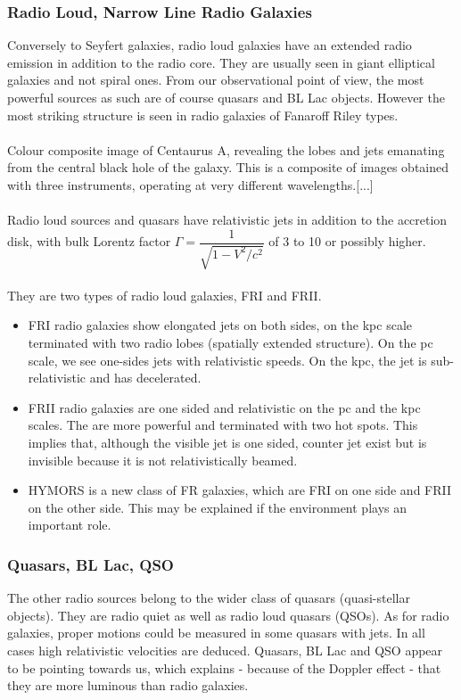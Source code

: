 \documentclass[10pt,a4paper]{article}
\begin{document}
\subsubsection{Radio Loud, Narrow Line Radio Galaxies}
Conversely to Seyfert galaxies, radio loud galaxies have an extended radio emission in addition to the radio core. They are usually seen in giant elliptical galaxies and not spiral ones. From our observational point of view, the most powerful sources as such are of course quasars and BL Lac objects. However the most striking structure is seen in radio galaxies of Fanaroff Riley types.\\
\\
Colour composite image of Centaurus A, revealing the lobes and jets emanating from the central black hole of the galaxy. This is a composite of images obtained with three instruments, operating at very different wavelengths.[...]\\
\\
Radio loud sources and quasars have relativistic jets in addition to the accretion disk, with bulk Lorentz factor $\Gamma=\dfrac{1}{\sqrt{1-V^2/c^2}}$ of 3 to 10 or possibly higher.\\
\\
They are two types of radio loud galaxies, FRI and FRII.
\begin{itemize}
\item FRI radio galaxies show elongated jets on both sides, on the kpc scale terminated with two radio lobes (spatially extended structure). On the pc scale, we see one-sides jets with relativistic speeds. On the kpc, the jet is sub-relativistic and has decelerated.
\item FRII radio galaxies are one sided and relativistic on the pc and the kpc scales. The are more powerful and terminated with two hot spots. This implies that, although the visible jet is one sided, counter jet exist but is invisible because it is not relativistically beamed.
\item HYMORS is a new class of FR galaxies, which are FRI on one side and FRII on the other side. This may be explained if the environment plays an important role.
\end{itemize}
\subsubsection{Quasars, BL Lac, QSO}
The other radio sources belong to the wider class of quasars (quasi-stellar objects). They are radio quiet as well as radio loud quasars (QSOs). As for radio galaxies, proper motions could be measured in some quasars with jets. In all cases high relativistic velocities are deduced. Quasars, BL Lac and QSO appear to be pointing towards us, which explains - because of the Doppler effect - that they are more luminous than radio galaxies.
\end{document}
